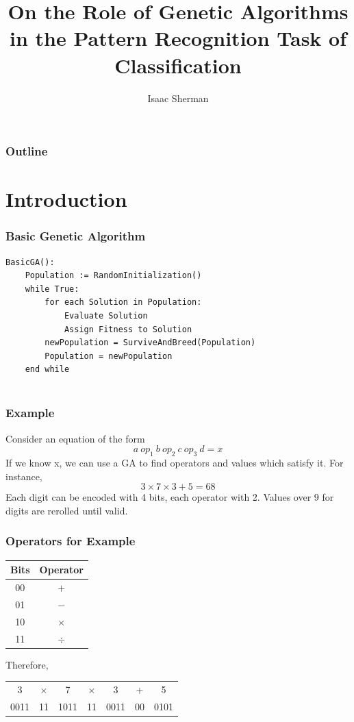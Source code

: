 \documentclass{beamer}
\title[Genetic Algorithms in Classification]{On the Role of Genetic Algorithms in the Pattern Recognition Task of Classification}
\author{Isaac Sherman}
\institute{Electrical Engineering and Computer Science}
\begin{document}
\begin{frame}
\titlepage
\end{frame}

\begin{frame}
	\frametitle{Outline}
	\begin{multicols}{2}
	\tableofcontents
\end{multicols}
\end{frame}

\section{Introduction}
\begin{frame}[fragile]
\frametitle{Basic Genetic Algorithm}
\begin{lstlisting}[language = algorithm, basicstyle=\scriptsize]
BasicGA():
	Population := RandomInitialization()
	while True:
		for each Solution in Population:
			Evaluate Solution
			Assign Fitness to Solution
		newPopulation = SurviveAndBreed(Population)
		Population = newPopulation
	end while
	
	\end{lstlisting}
\end{frame}

\begin{frame}
	\frametitle{Example}
	Consider an equation of the form $$		a \: op_1\: b\: op_2\: c\: op_3\: d =x$$
	If we know x, we can use a GA to find operators and values which satisfy it.  For instance, 
	$$		3 \times 7 \times 3 + 5 = 68$$
	Each digit can be encoded with 4 bits, each operator with 2.  Values over 9 for digits are rerolled until valid.
\end{frame}
\begin{frame}[fragile]
	
	\frametitle{Operators for Example}
	\begin{tabular}{|c| c|}\hline
	Bits & Operator\\
	\hline
	00&$+$\\
	01&$-$\\
	10&$\times$\\
	11&$\div$\\
	\hline
\end{tabular}

Therefore, \\

\begin{tabular}{c c c c c c c}
	3& $\times$& 7& $\times$& 3& +& 5\\
	0011&11&1011&11&0011&00&0101\\
\end{tabular}
\end{frame}
\end{document}
